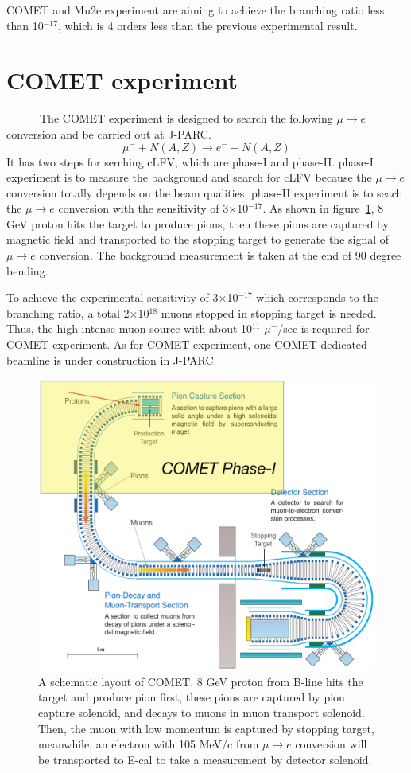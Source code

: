 COMET and Mu2e experiment are aiming to achieve the branching ratio less than 10$^{-17}$, which is 4 orders less than the previous experimental result.

\section{COMET experiment}
~~~~~~The COMET experiment is designed to search the following $\mu \rightarrow e$ conversion and be carried out at J-PARC.
\begin{equation}
 \mu^- + N(A, Z) \rightarrow e^- + N(A, Z)
\end{equation}
It has two steps for serching cLFV, which are phase-I and phase-II.
phase-I experiment is to measure the background and search for cLFV because the $\mu \rightarrow e$ conversion totally depends on the beam qualities.
phase-II experiment is to seach the $\mu \rightarrow e$ conversion with the sensitivity of 3$\times$10$^{-17}$.
As shown in figure~\ref{comet}, 8 GeV proton hits the target to produce pions, then these pions are captured by magnetic field and transported to the stopping target to generate the signal of $\mu \rightarrow e$ conversion.
The background measurement is taken at the end of 90 degree bending.

To achieve the experimental sensitivity of 3$\times$10$^{-17}$ which corresponds to the branching ratio, a total 2$\times$10$^{18}$ muons stopped in stopping target is needed.
Thus, the high intense muon source with about 10$^{11}$ $\mu^-$/sec is required for COMET experiment.
As for COMET experiment, one COMET dedicated beamline is under construction in J-PARC.
\begin{figure}[H]
 \centering
 \includegraphics[scale=0.55]{chapter1/fig/comet.pdf}
 \caption{A schematic layout of COMET. 8 GeV proton from B-line hits the target and produce pion first, these pions are captured by pion capture solenoid, and decays to muons in muon transport solenoid. Then, the muon with low momentum is captured by stopping target, meanwhile, an electron with 105 MeV/c from $\mu \rightarrow e$ conversion will be transported to E-cal to take a measurement by detector solenoid.}
\label{comet}
\end{figure}

